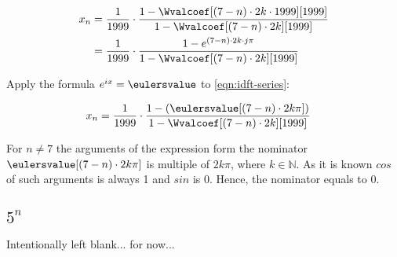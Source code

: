 \documentclass[a4paper]{article}
\theoremstyle{break}
\theoremstyle{break}
\begin{document}
\begin{equation} \label{eqn:idft-series}
  \begin{split}
    x_n &= \frac{1}{1999} \cdot
           \frac{1 - \Wvalcoef[(7 - n) \cdot 2k \cdot 1999][1999]}{1 - \Wvalcoef[(7 - n) \cdot 2k][1999]} \\
        &= \frac{1}{1999} \cdot
           \frac{1 - e^{(7 - n) \cdot 2k \cdot j \pi}}{1 - \Wvalcoef[(7 - n) \cdot 2k][1999]}
  \end{split}
\end{equation}

Apply the formula $e^{ix} = \eulersvalue$ to \eqref{eqn:idft-series}:

\begin{equation*}
  \begin{split}
    x_n &= \frac{1}{1999} \cdot
           \frac{1 - (\eulersvalue[(7 - n) \cdot 2k \pi])}{1 - \Wvalcoef[(7 - n) \cdot 2k][1999]}
  \end{split}
\end{equation*}

For $n \neq 7$ the arguments of the expression form the nominator $\eulersvalue[(7 - n) \cdot 2k \pi]$ is multiple of $2k\pi$, where $k \in \mathbb{N}$. As it is known $cos$ of such arguments is always 1 and $sin$ is 0. Hence, the nominator equals to 0.


\subsection{$5^n$}

Intentionally left blank... for now...


\end{document}
